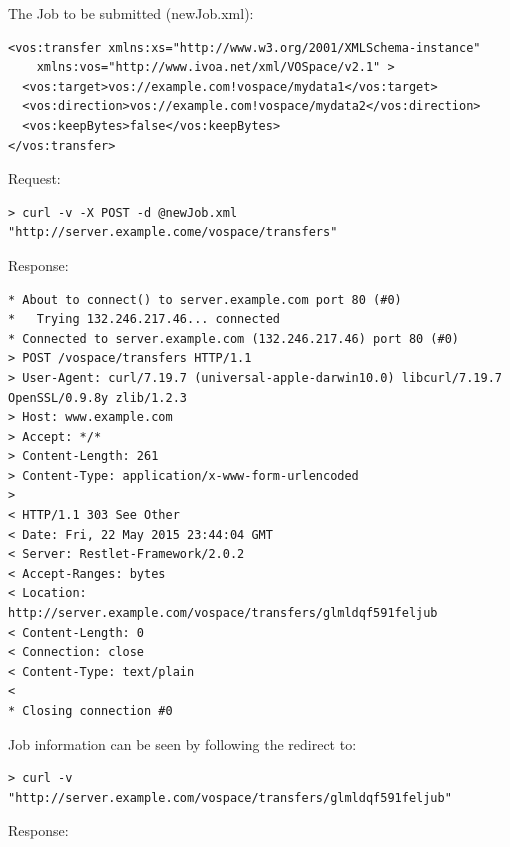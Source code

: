 \documentclass[11pt,a4paper]{ivoa}
\begin{document}
\noindent
The Job to be submitted (newJob.xml):
\begin{lstlisting}
<vos:transfer xmlns:xs="http://www.w3.org/2001/XMLSchema-instance"
    xmlns:vos="http://www.ivoa.net/xml/VOSpace/v2.1" >
  <vos:target>vos://example.com!vospace/mydata1</vos:target>
  <vos:direction>vos://example.com!vospace/mydata2</vos:direction>
  <vos:keepBytes>false</vos:keepBytes>
</vos:transfer>
\end{lstlisting}
Request:
\begin{lstlisting}
> curl -v -X POST -d @newJob.xml "http://server.example.come/vospace/transfers"
\end{lstlisting}
Response:
\begin{lstlisting}
* About to connect() to server.example.com port 80 (#0)
*   Trying 132.246.217.46... connected
* Connected to server.example.com (132.246.217.46) port 80 (#0)
> POST /vospace/transfers HTTP/1.1
> User-Agent: curl/7.19.7 (universal-apple-darwin10.0) libcurl/7.19.7 OpenSSL/0.9.8y zlib/1.2.3
> Host: www.example.com
> Accept: */*
> Content-Length: 261
> Content-Type: application/x-www-form-urlencoded
>
< HTTP/1.1 303 See Other
< Date: Fri, 22 May 2015 23:44:04 GMT
< Server: Restlet-Framework/2.0.2
< Accept-Ranges: bytes
< Location: http://server.example.com/vospace/transfers/glmldqf591feljub
< Content-Length: 0
< Connection: close
< Content-Type: text/plain
<
* Closing connection #0
\end{lstlisting}
Job information can be seen by following the redirect to:
\begin{lstlisting}
> curl -v "http://server.example.com/vospace/transfers/glmldqf591feljub"
\end{lstlisting}
Response:
\end{document}
